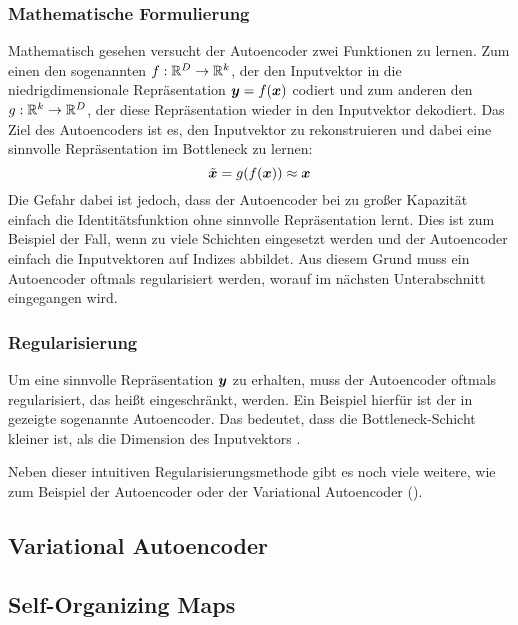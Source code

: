 \subsubsection{Mathematische Formulierung}
\label{ch:MethodenDerDimRed:modern:AE:MathematischeFormulierung}
Mathematisch gesehen versucht der Autoencoder zwei Funktionen zu lernen. Zum einen den sogenannten  $f: \mathbb{R}^D \rightarrow \mathbb{R}^k$, der den Inputvektor in die niedrigdimensionale Repräsentation $\bm{y} = f(\bm{x})$ codiert und zum anderen den  $g: \mathbb{R}^k \rightarrow \mathbb{R}^D$, der diese Repräsentation wieder in den Inputvektor dekodiert. Das Ziel des Autoencoders ist es, den Inputvektor zu rekonstruieren und dabei eine sinnvolle Repräsentation im Bottleneck zu lernen:
\begin{equation}
	\tilde{\bm{x}} = g(f(\bm{x})) \approx \bm{x}
\end{equation}
Die Gefahr dabei ist jedoch, dass der Autoencoder bei zu großer Kapazität einfach die Identitätsfunktion ohne sinnvolle Repräsentation lernt. Dies ist zum Beispiel der Fall, wenn zu viele Schichten eingesetzt werden und der Autoencoder einfach die Inputvektoren auf Indizes abbildet. Aus diesem Grund muss ein Autoencoder oftmals regularisiert werden, worauf im nächsten Unterabschnitt eingegangen wird.

\subsubsection{Regularisierung}

Um eine sinnvolle Repräsentation $\bm{y}$ zu erhalten, muss der Autoencoder oftmals
regularisiert, das heißt eingeschränkt, werden. Ein Beispiel hierfür ist der in
 gezeigte sogenannte  Autoencoder. Das
bedeutet, dass die Bottleneck-Schicht kleiner ist, als die Dimension des Inputvektors \parencite[503]{Goodfellow.2016}.

Neben dieser intuitiven Regularisierungsmethode gibt es noch viele weitere, wie zum Beispiel der
 Autoencoder oder der Variational Autoencoder
().

\subsection{Variational Autoencoder}
\label{ch:MethodenDerDimRed:modern:VAE}

\subsection{Self-Organizing Maps}
\label{ch:MethodenDerDimRed:modern:SOM}
